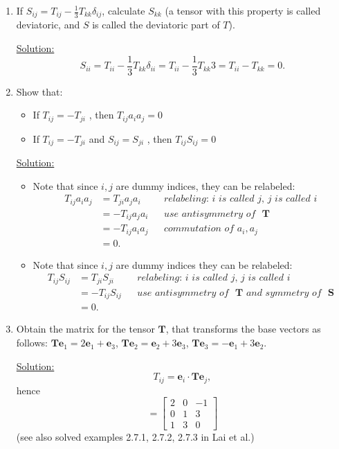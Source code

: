 \documentclass{article}
\newcommand{\ee}{\end{equation}}
\newcommand{\be}{\begin{equation}}
\newcommand{\bi}{\begin{itemize}}
\newcommand{\ei}{\end{itemize}}
\newcommand{\bs}{\boldsymbol}
\begin{document}
\begin{enumerate}
\item If $S_{ij}=T_{ij}-\frac{1}{3}T_{kk} \delta_{ij}$, calculate $S_{kk}$ (a tensor with this property is called deviatoric, and $S$ is 
called the deviatoric part of $T$).


\underline{Solution:}
\be
S_{ii}=T_{ii}-\frac{1}{3}T_{kk} \delta_{ii}=T_{ii}-\frac{1}{3}T_{kk} 3=T_{ii}-T_{kk}=0.
\ee

%
\item  Show that:
\bi
\item  If $T_{ij}=-T_{ji}$ , then $T_{ij} a_i a_j=0$
\item If $T_{ij}=-T_{ji}$  and $S_{ij} =S_{ji}$ , then $T_{ij} S_{ij}=0$
\ei

\underline{Solution:}
\bi
\item Note that since $i,j$ are dummy indices, they can be relabeled:
\begin{align}
T_{ij} a_i a_j &= T_{ji} a_j a_i && \textit{relabeling: $i$ is called $j$, $j$ is called $i$} \\ \nonumber
&= -T_{ij}a_ja_i && \textit{use antisymmetry of ~$\bs T$} \\ \nonumber
&=-T_{ij}a_ia_j && \textit{commutation of $a_i,a_j$} \\ \nonumber
& = 0.
\end{align}
\item  Note that since $i,j$ are dummy indices they can be relabeled:
\begin{align}
 T_{ij} S_{ij} &= T_{ji}S_{ji} && \textit{relabeling: $i$ is called $j$, $j$ is called $i$} \\ \nonumber
 &=-T_{ij} S_{ij} && \textit{use antisymmetry of ~$\bs T$ and symmetry of ~$\bs S$} \\ \nonumber
 &= 0.
\end{align}
\ei


\item Obtain the matrix for the tensor $\bs{T}$, that transforms the base vectors as follows: $\bs{T}\bs{e}_1=2\bs{e}_1+\bs{e}_3$,
$\bs{T}\bs{e}_2=\bs{e}_2+3\bs{e}_3$, $\bs{T}\bs{e}_3=-\bs{e}_1+3\bs{e}_2$.
%

\underline{Solution:}
\be
T_{ij} = \bs e_i \cdot \bs T \bs e_j,
\ee
hence
\be
[\bs{T}]=\left[ \begin{array}{lll} 2 & 0 & -1 \\ 0 & 1& 3 \\ 1 &3 & 0 \end{array} \right]
\ee
(see also solved examples 2.7.1, 2.7.2, 2.7.3 in Lai et al.)


\end{enumerate}
\end{document}
